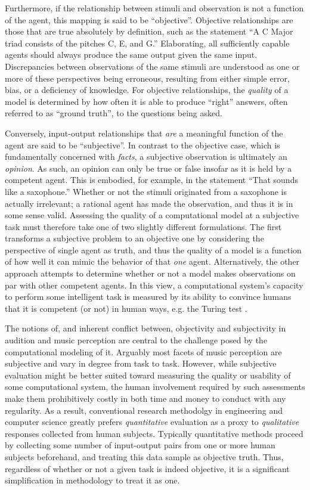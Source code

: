 Furthermore, if the relationship between stimuli and observation is not a function of the agent, this mapping is said to be ``objective''.
Objective relationships are those that are true absolutely by definition, such as the statement ``A C Major triad consists of the pitches C, E, and G.''
Elaborating, all sufficiently capable agents should always produce the same output given the same input.
Discrepancies between observations of the same stimuli are understood as one or more of these perspectives being erroneous, resulting from either simple error, bias, or a deficiency of knowledge.
For objective relationships, the \emph{quality} of a model is determined by how often it is able to produce ``right'' answers, often referred to as ``ground truth'', to the questions being asked.

Conversely, input-output relationships that \emph{are} a meaningful function of the agent are said to be ``subjective''.
In contrast to the objective case, which is fundamentally concerned with \emph{facts}, a subjective observation is ultimately an \emph{opinion}.
As such, an opinion can only be true or false insofar as it is held by a competent agent.
This is embodied, for example, in the statement ``That sounds like a saxophone.''
Whether or not the stimuli originated from a saxophone is actually irrelevant;
a rational agent has made the observation, and thus it is in some sense valid.
Assessing the quality of a computational model at a subjective task must therefore take one of two slightly different formulations.
The first transforms a subjective problem to an objective one by considering the perspective of single agent as truth, and thus the quality of a model is a function of how well it can mimic the behavior of that \emph{one} agent.
Alternatively, the other approach attempts to determine whether or not a model makes observations on par with other competent agents. %
In this view, a computational system's capacity to perform some intelligent task is measured by its ability to convince humans that it is competent (or not) in human ways, e.g. the Turing test \cite{Turing1950}.

The notions of, and inherent conflict between, objectivity and subjectivity in audition and music perception are central to the challenge posed by the computational modeling of it.
Arguably most facets of music perception are subjective and vary in degree from task to task.
However, while subjective evaluation might be better suited toward measuring the quality or usability of some computational system, the human involvement required by such assessments make them prohibitively costly in both time and money to conduct with any regularity.
As a result, conventional research methodolgy in engineering and computer science greatly prefers \emph{quantitative} evaluation as a proxy to \emph{qualitative} responses collected from human subjects.
Typically quantitative methods proceed by collecting some number of input-output pairs from one or more human subjects beforehand, and treating this data sample as objective truth.
Thus, regardless of whether or not a given task is indeed objective, it is a significant simplification in methodology to treat it as one.


